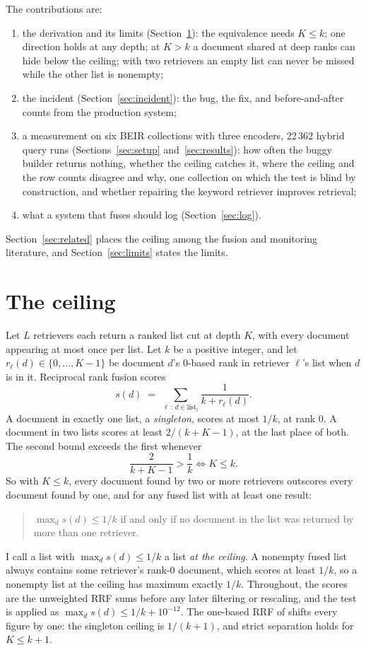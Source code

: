 \documentclass[11pt]{article}
\begin{document}
The contributions are:
\begin{enumerate}
\item the derivation and its limits (Section~\ref{sec:ceiling}): the equivalence needs $K \le k$; one direction holds at any depth; at $K > k$ a document shared at deep ranks can hide below the ceiling; with two retrievers an empty list can never be missed while the other list is nonempty;
\item the incident (Section~\ref{sec:incident}): the bug, the fix, and before-and-after counts from the production system;
\item a measurement on six BEIR collections with three encoders, 22\,362 hybrid query runs (Sections~\ref{sec:setup} and~\ref{sec:results}): how often the buggy builder returns nothing, whether the ceiling catches it, where the ceiling and the row counts disagree and why, one collection on which the test is blind by construction, and whether repairing the keyword retriever improves retrieval;
\item what a system that fuses should log (Section~\ref{sec:log}).
\end{enumerate}
Section~\ref{sec:related} places the ceiling among the fusion and monitoring literature, and Section~\ref{sec:limits} states the limits.

\section{The ceiling}
\label{sec:ceiling}

Let $L$ retrievers each return a ranked list cut at depth $K$, with every document appearing at most once per list. Let $k$ be a positive integer, and let $r_\ell(d) \in \{0, \ldots, K-1\}$ be document $d$'s 0-based rank in retriever $\ell$'s list when $d$ is in it. Reciprocal rank fusion scores
\[
  s(d) \;=\; \sum_{\ell \,:\, d \in \text{list}_\ell} \frac{1}{k + r_\ell(d)} .
\]
A document in exactly one list, a \emph{singleton}, scores at most $1/k$, at rank 0. A document in two lists scores at least $2/(k+K-1)$, at the last place of both. The second bound exceeds the first whenever
\[
  \frac{2}{k+K-1} > \frac{1}{k} \iff K \le k .
\]
So with $K \le k$, every document found by two or more retrievers outscores every document found by one, and for any fused list with at least one result:
\begin{quote}
$\max_d s(d) \le 1/k$ if and only if no document in the list was returned by more than one retriever.
\end{quote}
I call a list with $\max_d s(d) \le 1/k$ a list \emph{at the ceiling}. A nonempty fused list always contains some retriever's rank-0 document, which scores at least $1/k$, so a nonempty list at the ceiling has maximum exactly $1/k$. Throughout, the scores are the unweighted RRF sums before any later filtering or rescaling, and the test is applied as $\max_d s(d) \le 1/k + 10^{-12}$. The one-based RRF of \citet{cormack2009rrf} shifts every figure by one: the singleton ceiling is $1/(k+1)$, and strict separation holds for $K \le k+1$.
\end{document}
